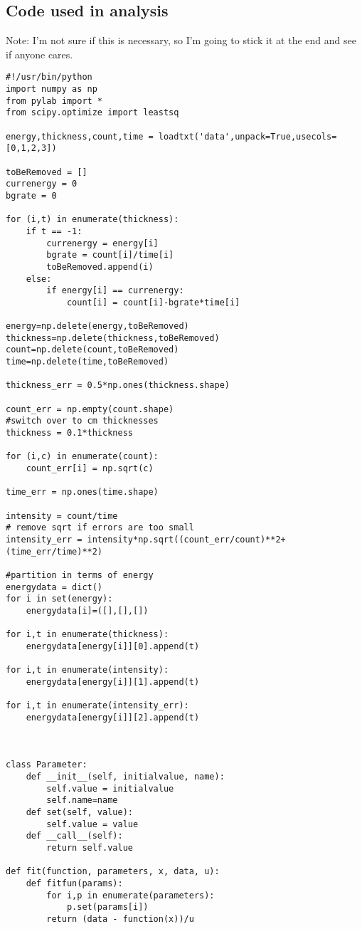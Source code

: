 \documentclass{amsart}
\begin{document}
\subsection{Code used in analysis}
Note: I'm not sure if this is necessary, so I'm going to stick it at the end and see if anyone cares.
\begin{verbatim}
#!/usr/bin/python
import numpy as np
from pylab import *
from scipy.optimize import leastsq

energy,thickness,count,time = loadtxt('data',unpack=True,usecols=[0,1,2,3])

toBeRemoved = []
currenergy = 0
bgrate = 0

for (i,t) in enumerate(thickness):
    if t == -1:
        currenergy = energy[i]
        bgrate = count[i]/time[i]
        toBeRemoved.append(i)
    else:
        if energy[i] == currenergy:
            count[i] = count[i]-bgrate*time[i]

energy=np.delete(energy,toBeRemoved)
thickness=np.delete(thickness,toBeRemoved)
count=np.delete(count,toBeRemoved)
time=np.delete(time,toBeRemoved)

thickness_err = 0.5*np.ones(thickness.shape)

count_err = np.empty(count.shape)
#switch over to cm thicknesses
thickness = 0.1*thickness

for (i,c) in enumerate(count):
    count_err[i] = np.sqrt(c)

time_err = np.ones(time.shape)

intensity = count/time
# remove sqrt if errors are too small
intensity_err = intensity*np.sqrt((count_err/count)**2+(time_err/time)**2)

#partition in terms of energy
energydata = dict()
for i in set(energy):
    energydata[i]=([],[],[])

for i,t in enumerate(thickness):
    energydata[energy[i]][0].append(t)

for i,t in enumerate(intensity):
    energydata[energy[i]][1].append(t)

for i,t in enumerate(intensity_err):
    energydata[energy[i]][2].append(t)



class Parameter:
    def __init__(self, initialvalue, name):
        self.value = initialvalue
        self.name=name
    def set(self, value):
        self.value = value
    def __call__(self):
        return self.value

def fit(function, parameters, x, data, u):
    def fitfun(params):
        for i,p in enumerate(parameters):
            p.set(params[i])
        return (data - function(x))/u
 

\end{verbatim}
\end{document}
